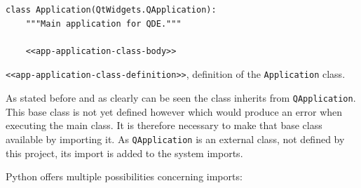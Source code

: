 \documentclass[10pt, openright, notitlepage]{scrreprt}
\begin{document}
\begin{listing}[H]
\begin{verbatim}
class Application(QtWidgets.QApplication):
    """Main application for QDE."""

    <<app-application-class-body>>
\end{verbatim}
\caption{\label{app-application-class-definition}
\texttt{<<app-application-class-definition>>}, definition of the \texttt{Application} class.}
\end{listing}

As stated before and as clearly can be seen the class inherits from
\texttt{QApplication}. This base class is not yet defined however which would produce
an error when executing the main class. It is therefore necessary to make that
base class available by importing it. As \texttt{QApplication} is an external class,
not defined by this project, its import is added to the system imports.

Python offers multiple possibilities concerning imports:
\end{document}
